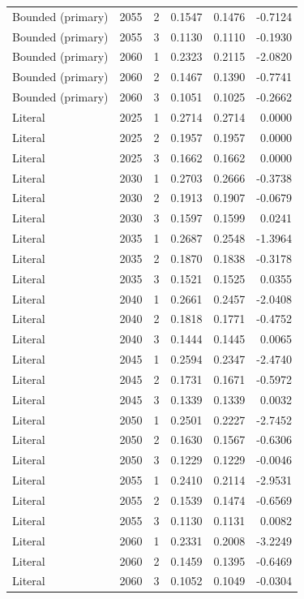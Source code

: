 \begin{longtable}{lrrrrr}
Bounded (primary) & 2055 & 2 & 0.1547 & 0.1476 & -0.7124 \\
Bounded (primary) & 2055 & 3 & 0.1130 & 0.1110 & -0.1930 \\
Bounded (primary) & 2060 & 1 & 0.2323 & 0.2115 & -2.0820 \\
Bounded (primary) & 2060 & 2 & 0.1467 & 0.1390 & -0.7741 \\
Bounded (primary) & 2060 & 3 & 0.1051 & 0.1025 & -0.2662 \\
Literal & 2025 & 1 & 0.2714 & 0.2714 & 0.0000 \\
Literal & 2025 & 2 & 0.1957 & 0.1957 & 0.0000 \\
Literal & 2025 & 3 & 0.1662 & 0.1662 & 0.0000 \\
Literal & 2030 & 1 & 0.2703 & 0.2666 & -0.3738 \\
Literal & 2030 & 2 & 0.1913 & 0.1907 & -0.0679 \\
Literal & 2030 & 3 & 0.1597 & 0.1599 & 0.0241 \\
Literal & 2035 & 1 & 0.2687 & 0.2548 & -1.3964 \\
Literal & 2035 & 2 & 0.1870 & 0.1838 & -0.3178 \\
Literal & 2035 & 3 & 0.1521 & 0.1525 & 0.0355 \\
Literal & 2040 & 1 & 0.2661 & 0.2457 & -2.0408 \\
Literal & 2040 & 2 & 0.1818 & 0.1771 & -0.4752 \\
Literal & 2040 & 3 & 0.1444 & 0.1445 & 0.0065 \\
Literal & 2045 & 1 & 0.2594 & 0.2347 & -2.4740 \\
Literal & 2045 & 2 & 0.1731 & 0.1671 & -0.5972 \\
Literal & 2045 & 3 & 0.1339 & 0.1339 & 0.0032 \\
Literal & 2050 & 1 & 0.2501 & 0.2227 & -2.7452 \\
Literal & 2050 & 2 & 0.1630 & 0.1567 & -0.6306 \\
Literal & 2050 & 3 & 0.1229 & 0.1229 & -0.0046 \\
Literal & 2055 & 1 & 0.2410 & 0.2114 & -2.9531 \\
Literal & 2055 & 2 & 0.1539 & 0.1474 & -0.6569 \\
Literal & 2055 & 3 & 0.1130 & 0.1131 & 0.0082 \\
Literal & 2060 & 1 & 0.2331 & 0.2008 & -3.2249 \\
Literal & 2060 & 2 & 0.1459 & 0.1395 & -0.6469 \\
Literal & 2060 & 3 & 0.1052 & 0.1049 & -0.0304 \\

\end{longtable}
